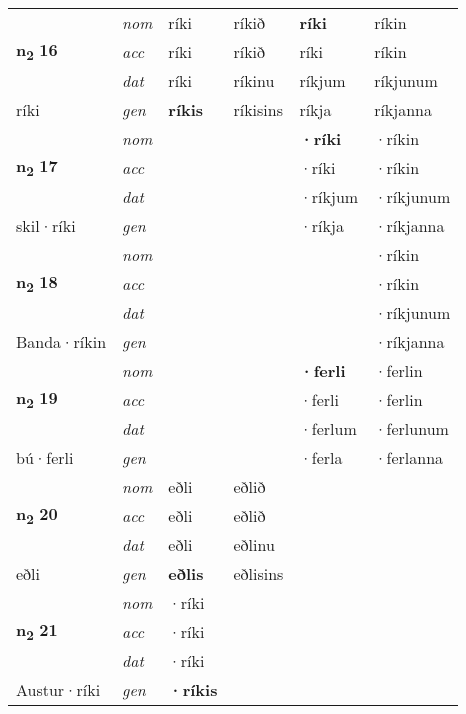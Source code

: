 \begin{longtable}[l]{X>{\footnotesize\itshape}XXXXX}
\multirow{3}{*}{{{\textbf{n{\textsubscript{2}}} \Large{\textbf{16}}}}} & nom & ríki & ríkið & \textbf{ríki} & ríkin \\*
 & acc & ríki & ríkið & ríki & ríkin \\*
 & dat & ríki & ríkinu & ríkjum & ríkjunum \\*
 {\footnotesize{ríki}} & gen & \textbf{ríkis} & ríkisins & ríkja & ríkjanna \\
\cmidrule{1-6}

\multirow{3}{*}{{{\textbf{n{\textsubscript{2}}} \Large{\textbf{17}}}}} & nom &  &  & \textbf{·ríki} & ·ríkin \\*
 & acc &  &  & ·ríki & ·ríkin \\*
 & dat &  &  & ·ríkjum & ·ríkjunum \\*
 {\footnotesize{skil\allowbreak ·ríki}} & gen & \textbf{} &  & ·ríkja & ·ríkjanna \\
\cmidrule{1-6}

\multirow{3}{*}{{{\textbf{n{\textsubscript{2}}} \Large{\textbf{18}}}}} & nom &  &  & \textbf{} & ·ríkin \\*
 & acc &  &  &  & ·ríkin \\*
 & dat &  &  &  & ·ríkjunum \\*
 {\footnotesize{Banda\allowbreak ·ríkin}} & gen & \textbf{} &  &  & ·ríkjanna \\
\cmidrule{1-6}

\multirow{3}{*}{{{\textbf{n{\textsubscript{2}}} \Large{\textbf{19}}}}} & nom &  &  & \textbf{·ferli} & ·ferlin \\*
 & acc &  &  & ·ferli & ·ferlin \\*
 & dat &  &  & ·ferlum & ·ferlunum \\*
 {\footnotesize{bú\allowbreak ·ferli}} & gen & \textbf{} &  & ·ferla & ·ferlanna \\
\cmidrule{1-6}

\multirow{3}{*}{{{\textbf{n{\textsubscript{2}}} \Large{\textbf{20}}}}} & nom & eðli & eðlið & \textbf{} &  \\*
 & acc & eðli & eðlið &  &  \\*
 & dat & eðli & eðlinu &  &  \\*
 {\footnotesize{eðli}} & gen & \textbf{eðlis} & eðlisins &  &  \\
\cmidrule{1-6}

\multirow{3}{*}{{{\textbf{n{\textsubscript{2}}} \Large{\textbf{21}}}}} & nom & ·ríki &  & \textbf{} &  \\*
 & acc & ·ríki &  &  &  \\*
 & dat & ·ríki &  &  &  \\*
 {\footnotesize{Austur\allowbreak ·ríki}} & gen & \textbf{·ríkis} &  &  &  \\
\cmidrule{1-6}


\end{longtable}
